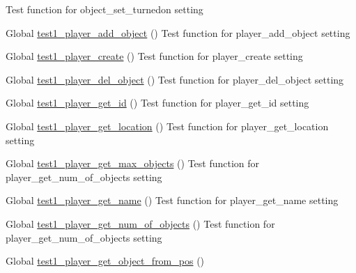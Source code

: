 \begin{DoxyRefList}
%
Test function for object\+\_\+set\+\_\+turnedon setting  
\item[Global \mbox{\hyperlink{player__test_8c_a14a3e4867e2ad3287c8efa99cd36904e}{test1\+\_\+player\+\_\+add\+\_\+object}} ()]\label{test__test000146}%
%
Test function for player\+\_\+add\+\_\+object setting  
\item[Global \mbox{\hyperlink{player__test_8c_ab29768452373e16bb6aaa1f7998f62fb}{test1\+\_\+player\+\_\+create}} ()]\label{test__test000134}%
%
Test function for player\+\_\+create setting  
\item[Global \mbox{\hyperlink{player__test_8c_ab8680555a9d30950ffa0547011a0f787}{test1\+\_\+player\+\_\+del\+\_\+object}} ()]\label{test__test000148}%
%
Test function for player\+\_\+del\+\_\+object setting  
\item[Global \mbox{\hyperlink{player__test_8c_a790a75dc179c00c60c784d3e34c0e5aa}{test1\+\_\+player\+\_\+get\+\_\+id}} ()]\label{test__test000136}%
%
Test function for player\+\_\+get\+\_\+id setting  
\item[Global \mbox{\hyperlink{player__test_8c_a408a557a0cff748c10fb9a03445af191}{test1\+\_\+player\+\_\+get\+\_\+location}} ()]\label{test__test000144}%
%
Test function for player\+\_\+get\+\_\+location setting  
\item[Global \mbox{\hyperlink{player__test_8c_a385c20b2160c0ad203ab59c7e498556b}{test1\+\_\+player\+\_\+get\+\_\+max\+\_\+objects}} ()]\label{test__test000159}%
%
Test function for player\+\_\+get\+\_\+num\+\_\+of\+\_\+objects setting  
\item[Global \mbox{\hyperlink{player__test_8c_a94068667d8faa66a4ad293dd2c60f2ef}{test1\+\_\+player\+\_\+get\+\_\+name}} ()]\label{test__test000140}%
%
Test function for player\+\_\+get\+\_\+name setting  
\item[Global \mbox{\hyperlink{player__test_8c_a33acb3fbb40579c2f52cecec5fa9f7ec}{test1\+\_\+player\+\_\+get\+\_\+num\+\_\+of\+\_\+objects}} ()]\label{test__test000154}%
%
Test function for player\+\_\+get\+\_\+num\+\_\+of\+\_\+objects setting  
\item[Global \mbox{\hyperlink{player__test_8c_a5b49be1cec7f0aa989e2abe7d2af6b18}{test1\+\_\+player\+\_\+get\+\_\+object\+\_\+from\+\_\+pos}} ()]\label{test__test000150}%
%

\end{DoxyRefList}
